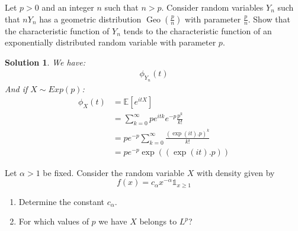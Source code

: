 \documentclass{article}
\newcommand{\esperance}[1]{\mathbb{E}[#1]}
\newtheorem{solution}{Solution}
\begin{document}
\begin{Exercise}
  Let $p>0$ and an integer $n$ such that $n>p$. Consider random variables $Y_{n}$ such that $n Y_{n}$ has a geometric distribution $\operatorname{Geo}\left(\frac{p}{n}\right)$ with parameter $\frac{p}{n}$. Show that the characteristic function of $Y_{n}$ tends to the characteristic function of an exponentially distributed random variable with parameter $p$.
\end{Exercise}

\begin{solution}
  We have:
  \begin{align*}
    \phi_{Y_n}(t)
  \end{align*}
  And if $X \sim Exp(p)$:
  \begin{align*}
    \phi_{X}(t) & = \esperance{e^{itX}}                                        \\
                & = \sum_{k = 0}^\infty p e^{itk} e^{-p} \frac{p^k}{k!}        \\
                & = p e^{-p} \sum_{k = 0}^\infty \frac{{(\exp{(it)}.p)}^k}{k!} \\
                & = p e^{-p} \exp{((\exp{(it)}.p))}
  \end{align*}
\end{solution}

\begin{Exercise} Let $\alpha>1$ be fixed. Consider the random variable $X$ with density given by
  \[
    f(x)=c_{\alpha} x^{-\alpha} \mathbb{1}_{x \geq 1}
  \]
  \begin{enumerate}
    \item Determine the constant $c_{\alpha}$.

    \item For which values of $p$ we have $X$ belongs to $L^{p}$?

  \end{enumerate}
\end{Exercise}
\end{document}
